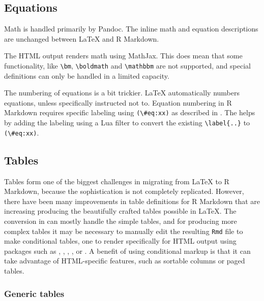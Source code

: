 \subsection{Equations}\label{equations}

Math is handled primarily by Pandoc. The inline math and equation descriptions are unchanged between LaTeX and R Markdown.

The HTML output renders math using MathJax. This does mean that some functionality, like \texttt{\textbackslash{}bm}, \texttt{\textbackslash{}boldmath} and \texttt{\textbackslash{}mathbbm} are not supported, and special definitions can only be handled in a limited capacity.

The numbering of equations is a bit trickier. LaTeX automatically numbers equations, unless specifically instructed not to. Equation numbering in R Markdown requires specific labeling using \texttt{(\textbackslash{}\#eq:xx)} as described in \citet{bookdown}. The  helps by adding the labeling using a Lua filter to convert the existing \texttt{\textbackslash{}label\{..\}} to \texttt{(\textbackslash{}\#eq:xx)}.

\subsection{Tables}\label{tables}

Tables form one of the biggest challenges in migrating from LaTeX to R Markdown, because the sophistication is not completely replicated. However, there have been many improvements in table definitions for R Markdown that are increasing producing the beautifully crafted tables possible in LaTeX. The conversion in  can mostly handle the simple tables, and for producing more complex tables it may be necessary to manually edit the resulting \texttt{Rmd} file to make conditional tables, one to render specifically for HTML output using packages such as  \citep{kableExtra},  \citep{gt},  \citep{htmlTable},  \citep{tableHTML},  \citep{tables} or  \citep{DT}. A benefit of using conditional markup is that it can take advantage of HTML-specific features, such as sortable columns or paged tables.

\subsubsection{Generic tables}\label{generic-tables}

